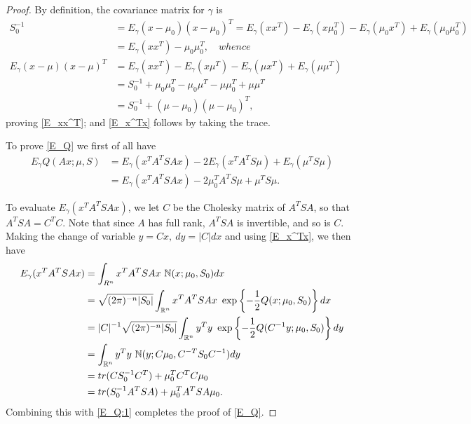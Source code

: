 \documentclass[12pt,leqno]{article}
\begin{document}
  \begin{proof}
    By definition, the covariance matrix for $\gamma$ is
    \begin{align*}
    S_0^{-1} &= E_{\gamma}(x-\mu_0)(x-\mu_0)^T = E_{\gamma}(xx^T) - E_{\gamma}(x\mu_0^T) - E_{\gamma}(\mu_0{x}^T) + E_{\gamma}(\mu_0\mu_0^T)\\
    &= E_{\gamma}(xx^T) - \mu_0\mu_0^T, \quad{whence}\\
    E_{\gamma}(x-\mu)(x-\mu)^T &= E_{\gamma}(xx^T) - E_{\gamma}(x\mu^T) - E_{\gamma}(\mu{x}^T) + E_{\gamma}(\mu\mu^T) \\
    &= S_0^{-1} + \mu_0\mu_0^T - \mu_0\mu^T-\mu\mu_0^T + \mu\mu^T\\
    &= S_0^{-1} + (\mu-\mu_0)(\mu-\mu_0)^T,
    \end{align*}
    proving \eqref{E_xx^T}; and \eqref{E_x^Tx} follows by taking the trace.

    To prove \eqref{E_Q} we first of all have
    \begin{equation}\label{E_Q:1}
      \begin{split}
      E_{\gamma}Q(Ax;\mu,S) &= E_{\gamma}(x^TA^TSAx) - 2E_{\gamma}(x^TA^TS\mu) + E_{\gamma}(\mu^TS\mu) \\
      &= E_{\gamma}(x^TA^TSAx) - 2\mu_0^TA^TS\mu + \mu^TS\mu.
      \end{split}
    \end{equation}
    
    To evaluate $E_{\gamma}(x^TA^TSAx)$, we let $C$ be the Cholesky matrix of $A^TSA$, so that
    $A^TSA = C^TC$.  Note that since $A$
    has full rank, $A^TSA$ is invertible, and so is $C$. Making the change
    of variable $y = Cx,~ dy = |C|dx$ and using \eqref{E_x^Tx}, we then have
      \begin{align*}
        E_{\gamma}(x^TA^TSAx) &= \int_{R^n}x^TA^TSAx~{\mathbb N}(x;\mu_0,S_0)dx\\
        &= \sqrt{(2\pi)^{-n}|S_0|}\int_{{\mathbb R}^n}x^TA^TSAx~\exp\left\{-\frac{1}{2}Q(x;\mu_0,S_0)\right\}dx \\
        &= |C|^{-1}\sqrt{(2\pi)^{-n}|S_0|}\int_{{\mathbb R}^n}y^Ty~\exp\left\{-\frac{1}{2}Q(C^{-1}y;\mu_0,S_0)\right\}dy \\
        &= \int_{{\mathbb R}^n}y^Ty~{\mathbb N}(y;C\mu_0,C^{-T}S_0C^{-1})dy\\
        &= tr(CS_0^{-1}C^T) + \mu_0^TC^TC\mu_0 \\
        &= tr(S_0^{-1}A^TSA) + \mu_0^TA^TSA\mu_0.
      \end{align*}
    Combining this with \eqref{E_Q:1} completes the proof of \eqref{E_Q}.  
  \end{proof}
\end{document}
